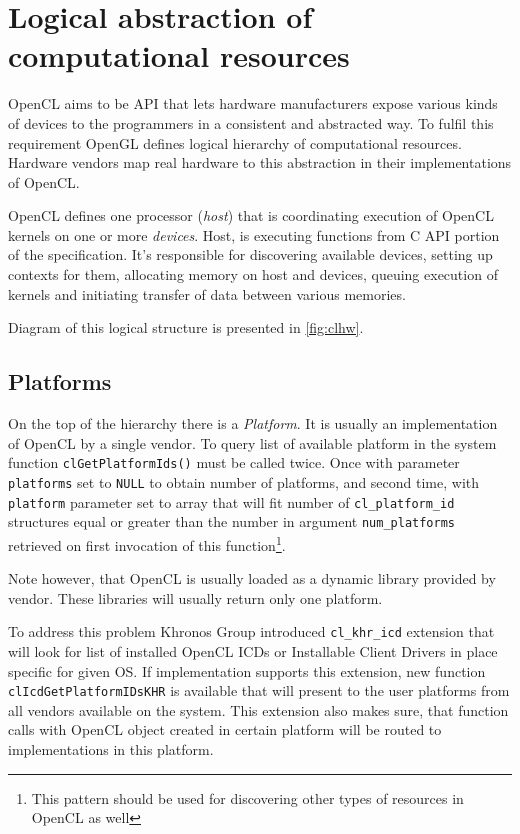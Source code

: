 \section{Logical abstraction of computational resources}
\label{sec:cllogicalabstraction}
OpenCL aims to be API that lets hardware manufacturers expose various kinds of
devices to the programmers in a consistent and abstracted way. To fulfil this
requirement OpenGL defines logical hierarchy of computational resources.
Hardware vendors map real hardware to this abstraction in their implementations
of OpenCL.

OpenCL defines one processor (\emph{host}) that is coordinating execution of
OpenCL kernels on one or more \emph{devices}. Host, is executing functions from
C API portion of the specification. It's responsible for discovering available
devices, setting up contexts for them, allocating memory on host and devices,
queuing execution of kernels and initiating transfer of data between various
memories.

Diagram of this logical structure is presented in \autoref{fig:clhw}.

\subsection{Platforms}

On the top of the hierarchy there is a \emph{Platform}. It is usually an implementation
of OpenCL by a single vendor. To query list of available platform in the system
function \texttt{clGetPlatformIds()} must be called twice. Once with parameter
\texttt{platforms} set to \texttt{NULL} to obtain number of platforms, and
second time, with \texttt{platform} parameter set to array that will fit
number of \texttt{cl\_platform\_id} structures equal or greater than the number
in argument \texttt{num\_platforms} retrieved on first invocation of this
function\footnote{This pattern should be used for discovering other types of resources
in OpenCL as well}.

Note however, that OpenCL is usually loaded as a dynamic library provided by
vendor. These libraries will usually return only one platform.

To address this problem Khronos Group introduced \texttt{cl\_khr\_icd} extension
that will look for list of installed OpenCL
ICDs or Installable Client Drivers in place specific for given OS. If
implementation supports this extension, new function \texttt{clIcd\-Get\-Platform\-IDsKHR}
is available that will present to the user platforms from all vendors available
on the system. This extension also makes sure, that function calls with OpenCL
object created in certain platform will be routed to implementations in this
platform.

